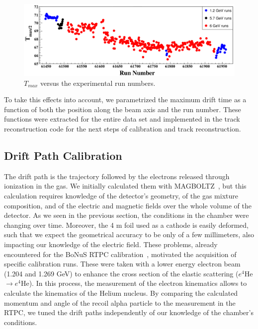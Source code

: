 \documentclass[preprint,5p]{elsarticle}
\begin{document}
\begin{figure}[t!]
\centering
\includegraphics[width=17.5cm]{Drift_run_number.pdf}
\caption{$T_{max}$ versus the experimental run numbers.} 
\label{fig:Drift_run_number_1}
\end{figure}

To take this effects into account, we parametrized the maximum drift time 
as a function of both the position along the beam axis and the run number. These 
functions were extracted for the entire data set and implemented in the track 
reconstruction code for the next steps of calibration and track reconstruction.
   
\subsection{Drift Path Calibration}

The drift path is the trajectory followed by the electrons released through 
ionization in the gas. We initially calculated them with
MAGBOLTZ~\cite{Biagi:1999nwa}, but this calculation requires knowledge of the detector's 
geometry, of the gas mixture composition, and of the electric and magnetic 
fields over the whole volume of the detector. As we seen in the previous section, 
the conditions in the 
chamber were changing over time. Moreover, the 4 \textmu{}m foil used as a cathode 
is easily deformed, such that we expect the geometrical accuracy to be only of a few 
millimeters, also impacting our knowledge of the electric field. These 
problems, already encountered for the BoNuS RTPC 
calibration~\cite{Fenker:2008zz}, motivated the acquisition of specific 
calibration runs. These were taken with a lower energy electron beam (1.204 and 
1.269 GeV) to enhance the cross section of the elastic scattering 
($e^{4}$He$\rightarrow e^{4}$He). In this process, the measurement of
the electron kinematics allows to calculate the kinematics of the Helium nucleus. 
By comparing the calculated momentum and angle of the recoil alpha particle to the 
measurement in the RTPC, we tuned the drift paths independently of our 
knowledge of the chamber's conditions.
\end{document}
